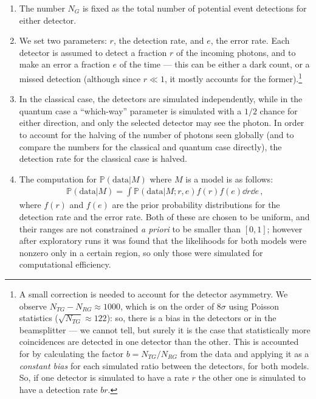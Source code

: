 \documentclass[main.tex]{subfiles}
\begin{document}
\begin{enumerate}
    \item The number \(N_G\) is fixed as the total number of potential event detections for either detector. 
    \item We set two parameters: \(r\), the detection rate, and \(e\), the error rate.
    Each detector is assumed to detect a fraction \(r\) of the incoming photons, and to make an error a fraction \(e\) of the time --- this can be either a dark count, or a missed detection (although since \(r \ll 1\), it mostly accounts for the former).\footnote{A small correction is needed to account for the detector asymmetry. We observe \(N_{TG} - N_{RG} \approx 1000\), which is on the order of \(8 \sigma \) using Poisson statistics (\(\sqrt{N_{TG}} \approx 122\)): so, there is a bias in the detectors or in the beamsplitter --- we cannot tell, but surely it is the case that statistically more coincidences are detected in one detector than the other. This is accounted for by calculating the factor \(b = N_{TG} / N_{RG}\) from the data and applying it as a \emph{constant bias} for each simulated ratio between the detectors, for both models. So, if one detector is simulated to have a rate \(r\) the other one is simulated to have a detection rate \(br\).}
    \item In the classical case, the detectors are simulated independently, while in the quantum case a ``which-way'' parameter is simulated with a \(1/2\) chance for either direction, and only the selected detector may see the photon. In order to account for the halving of the number of photons seen globally (and to compare the numbers for the classical and quantum case directly), the detection rate for the classical case is halved.
    \item The computation for \(\mathbb{P}(\text{data} | M)\) where \(M\) is a model is as follows: 
    \begin{align}
    \mathbb{P}(\text{data} | M) = 
    \int \mathbb{P}(\text{data} | M; r, e) f(r) f(e) \dd{r} \dd{e}
    \,,
    \end{align}
    where \(f(r)\) and \(f(e)\) are the prior probability distributions for the detection rate and the error rate. 
    Both of these are chosen to be uniform, and their ranges are not constrained \emph{a priori} to be smaller than \([0,1]\); however after exploratory runs it was found that the likelihoods for both models were nonzero only in a certain region, so only those were simulated for computational efficiency.
    

\end{enumerate}
\end{document}
